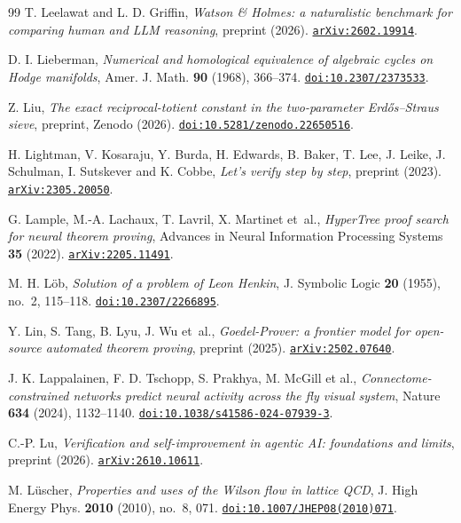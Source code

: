 \begin{thebibliography}{99}
T. Leelawat and L. D. Griffin,
\emph{Watson \& Holmes: a naturalistic benchmark for comparing human and LLM reasoning},
preprint (2026).
\href{https://arxiv.org/abs/2602.19914}{\nolinkurl{arXiv:2602.19914}}.

D. I. Lieberman,
\emph{Numerical and homological equivalence of algebraic cycles on Hodge manifolds},
Amer. J. Math. \textbf{90} (1968), 366--374.
\href{https://doi.org/10.2307/2373533}{\nolinkurl{doi:10.2307/2373533}}.

Z. Liu,
\emph{The exact reciprocal-totient constant in the two-parameter Erd\H{o}s--Straus sieve},
preprint, Zenodo (2026).
\href{https://doi.org/10.5281/zenodo.22650516}{\nolinkurl{doi:10.5281/zenodo.22650516}}.

H. Lightman, V. Kosaraju, Y. Burda, H. Edwards, B. Baker, T. Lee, J. Leike, J. Schulman, I. Sutskever and K. Cobbe,
\emph{Let's verify step by step},
preprint (2023).
\href{https://arxiv.org/abs/2305.20050}{\nolinkurl{arXiv:2305.20050}}.

G. Lample, M.-A. Lachaux, T. Lavril, X. Martinet et~al.,
\emph{HyperTree proof search for neural theorem proving},
Advances in Neural Information Processing Systems \textbf{35} (2022).
\href{https://arxiv.org/abs/2205.11491}{\nolinkurl{arXiv:2205.11491}}.

M. H. L\"ob,
\emph{Solution of a problem of Leon Henkin},
J. Symbolic Logic \textbf{20} (1955), no.~2, 115--118.
\href{https://doi.org/10.2307/2266895}{\nolinkurl{doi:10.2307/2266895}}.

Y. Lin, S. Tang, B. Lyu, J. Wu et~al.,
\emph{Goedel-Prover: a frontier model for open-source automated theorem proving},
preprint (2025).
\href{https://arxiv.org/abs/2502.07640}{\nolinkurl{arXiv:2502.07640}}.

J. K. Lappalainen, F. D. Tschopp, S. Prakhya, M. McGill et al.,
\emph{Connectome-constrained networks predict neural activity across the fly visual system},
Nature \textbf{634} (2024), 1132--1140.
\href{https://doi.org/10.1038/s41586-024-07939-3}{\nolinkurl{doi:10.1038/s41586-024-07939-3}}.

C.-P. Lu,
\emph{Verification and self-improvement in agentic AI: foundations and limits},
preprint (2026).
\href{https://arxiv.org/abs/2610.10611}{\nolinkurl{arXiv:2610.10611}}.

M. L\"uscher,
\emph{Properties and uses of the Wilson flow in lattice QCD},
J. High Energy Phys. \textbf{2010} (2010), no.~8, 071.
\href{https://doi.org/10.1007/JHEP08(2010)071}{\nolinkurl{doi:10.1007/JHEP08(2010)071}}.


\end{thebibliography}
